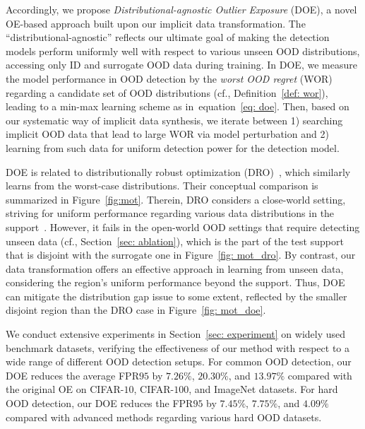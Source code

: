 \documentclass{article} \usepackage{iclr2022_conference,times}
\def\eqref#1{equation~\ref{#1}}
\begin{document}
Accordingly, we propose \emph{Distributional-agnostic Outlier Exposure} (DOE), a novel OE-based approach built upon our implicit data transformation. The ``distributional-agnostic'' reflects our ultimate goal of making the detection models perform uniformly well with respect to various unseen OOD distributions, accessing only ID and surrogate OOD data during training. In DOE, we measure the model performance in OOD detection by the \emph{worst OOD regret} (WOR) regarding a candidate set of OOD distributions (cf., Definition~\ref{def: wor}), leading to a min-max learning scheme as in~\eqref{eq: doe}. Then, based on our systematic way of implicit data synthesis, we iterate between 1) searching implicit OOD data that lead to large WOR via model perturbation and 2) learning from such data for uniform detection power for the detection model. 

DOE is related to distributionally robust optimization (DRO)~\citep{rahimian2019distributionally}, which similarly learns from the worst-case distributions. Their conceptual comparison is summarized in Figure~\ref{fig:mot}. Therein, DRO considers a close-world setting, striving for uniform performance regarding various data distributions in the support~\citep{sagawa2019distributionally}. However, it fails in the open-world OOD settings that require detecting unseen data (cf., Section~\ref{sec: ablation}), which is the part of the test support that is disjoint with the surrogate one in Figure~\ref{fig: mot_dro}. By contrast, our data transformation offers an effective approach in learning from unseen data, considering the region's uniform performance beyond the support. Thus, DOE can mitigate the distribution gap issue to some extent, reflected by the smaller disjoint region than the DRO case in Figure~\ref{fig: mot_doe}. 







We conduct extensive experiments in Section~\ref{sec: experiment} on widely used benchmark datasets, verifying the effectiveness of our method with respect to a wide range of different OOD detection setups. For common OOD detection, our DOE reduces the average FPR$95$ by {$7.26\%$, $20.30\%$, and $13.97\%$} compared with the original OE on CIFAR-$10$, CIFAR-$100$, and ImageNet datasets. For hard OOD detection, our DOE reduces the FPR$95$ by $7.45\%$, $7.75\%$, and $4.09\%$ compared with advanced methods regarding various hard OOD datasets. 
\end{document}
